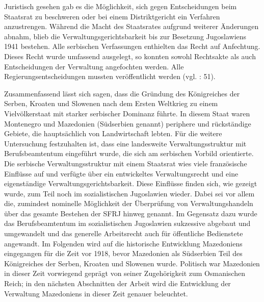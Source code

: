 Juristisch gesehen gab es die Möglichkeit, sich gegen Entscheidungen beim Staatsrat zu beschweren oder bei einem Distriktgericht ein Verfahren anzustrengen. Während die Macht des Staatsrates aufgrund weiterer Änderungen abnahm, blieb die Verwaltungsgerichtsbarkeit bis zur Besetzung Jugoslawiens 1941 bestehen. Alle serbischen Verfassungen enthielten das Recht auf Anfechtung. Dieses Recht wurde umfassend ausgelegt, so konnten sowohl Rechtsakte als auch Entscheidungen der Verwaltung angefochten werden. Alle Regierungsentscheidungen mussten veröffentlicht werden (vgl. \cite{sevic} : 51).\par
Zusammenfassend lässt sich sagen, dass die Gründung des Königreiches der Serben, Kroaten und Slowenen nach dem Ersten Weltkrieg zu einem Vielvölkerstaat mit starker serbischer Dominanz führte. In diesem Staat waren Montenegro und Mazedonien (Südserbien genannt) periphere und rückständige Gebiete, die hauptsächlich von Landwirtschaft lebten. Für die weitere Untersuchung festzuhalten ist, dass eine landesweite Verwaltungsstruktur mit Berufsbeamtentum eingeführt wurde, die sich am serbischen Vorbild orientierte. Die serbische Verwaltungsstruktur mit einem Staatsrat wies viele französische Einflüsse auf und verfügte über ein entwickeltes Verwaltungsrecht und eine eigenständige Verwaltungsgerichtsbarkeit. Diese Einflüsse finden sich, wie gezeigt wurde, zum Teil noch im sozialistischen Jugoslawien wieder. Dabei sei vor allem die, zumindest nominelle Möglichkeit der Überprüfung von Verwaltungshandeln über das gesamte Bestehen der SFRJ hinweg genannt. Im Gegensatz dazu wurde das Berufsbeamtentum im sozialistischen Jugoslawien sukzessive abgebaut und umgewandelt und das generelle Arbeitsrecht auch für öffentliche Bedienstete angewandt.
Im Folgenden wird auf die historische Entwicklung Mazedoniens eingegangen für die Zeit vor 1918, bevor Mazedonien als Südserbien Teil des Königreiches der Serben, Kroaten und Slowenen wurde. Politisch war Mazedonien in dieser Zeit vorwiegend geprägt von seiner Zugehörigkeit zum Osmanischen Reich; in den nächsten Abschnitten der Arbeit wird die Entwicklung der Verwaltung Mazedoniens in dieser Zeit genauer beleuchtet.
